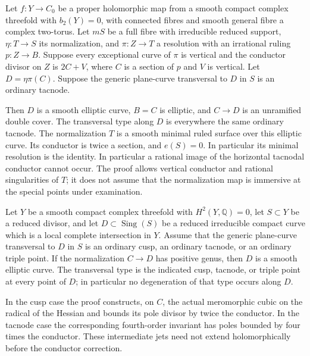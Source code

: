 \begin{proposition}\hypertarget{tag-01B8}{}\label{cdp:st:A.5.18}


Let $f:Y\to C_0$ be a proper holomorphic map from a smooth
compact complex threefold with $b_2(Y)=0$, with connected
fibres and smooth general fibre a complex two-torus.
Let $mS$ be a full fibre with irreducible reduced support,
$\eta:T\to S$ its normalization, and $\pi:Z\to T$ a
resolution with an irrational ruling $p:Z\to B$.
Suppose every exceptional curve of $\pi$ is vertical and
the conductor divisor on $Z$ is $2C+V$, where $C$ is a
section of $p$ and $V$ is vertical. Let $D=\eta\pi(C)$.
Suppose the generic plane-curve transversal to $D$ in $S$ is an
ordinary tacnode.

Then $D$ is a smooth elliptic curve, $B=C$ is elliptic,
and $C\to D$ is an unramified double cover. The transversal
type along $D$ is everywhere the same ordinary tacnode.
The normalization $T$ is a smooth minimal ruled surface
over this elliptic curve. Its conductor is twice a
section, and $e(S)=0$. In particular its minimal
resolution is the identity.
In particular a rational image of
the horizontal tacnodal conductor cannot occur. The proof
allows vertical conductor and rational singularities of
$T$; it does not assume that the normalization map is
immersive at the special points under examination.
\end{proposition}

\begin{proposition}\hypertarget{tag-01BF}{}\label{cdp:st:A.5.5}


Let $Y$ be a smooth compact complex threefold with
$H^2(Y,\mathbb Q)=0$, let $S\subset Y$ be a reduced divisor,
and let $D\subset\operatorname{Sing}(S)$ be a reduced
irreducible compact curve which is a local complete intersection
in $Y$. Assume that the generic plane-curve transversal to $D$
in $S$ is an ordinary cusp, an ordinary tacnode, or an ordinary
triple point.
If the normalization $C\to D$ has positive genus, then $D$ is
a smooth elliptic curve. The transversal type is the indicated
cusp, tacnode, or triple point at every point of $D$;
in particular no degeneration of that type occurs along $D$.

In the cusp case the proof constructs, on $C$, the actual
meromorphic cubic on the radical of the Hessian and bounds its
pole divisor by twice the conductor. In the tacnode case the
corresponding fourth-order invariant has poles bounded by four
times the conductor. These intermediate jets need not extend
holomorphically before the conductor correction.
\end{proposition}

